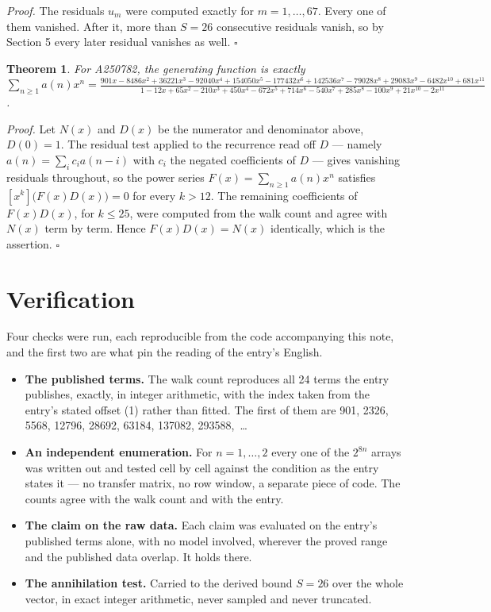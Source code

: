 \documentclass[11pt]{article}
\newtheorem{theorem}{Theorem}
\theoremstyle{definition}
\begin{document}
{\itshape Proof.} The residuals $u_m$ were computed exactly for $m = 1,\dots,67$. Every one of them vanished. After it, more than $S = 26$ consecutive residuals vanish, so by Section 5 every later residual vanishes as well. $\square$

\begin{theorem} For A250782, the generating function is exactly $\sum_{n\ge 1} a(n)x^n = \frac{901x - 8486x^{2} + 36221x^{3} - 92040x^{4} + 154050x^{5} - 177432x^{6} + 142536x^{7} - 79028x^{8} + 29083x^{9} - 6482x^{10} + 681x^{11}}{1 - 12x + 65x^{2} - 210x^{3} + 450x^{4} - 672x^{5} + 714x^{6} - 540x^{7} + 285x^{8} - 100x^{9} + 21x^{10} - 2x^{11}}$.\end{theorem}

{\itshape Proof.} Let $N(x)$ and $D(x)$ be the numerator and denominator above, $D(0)=1$. The residual test applied to the recurrence read off $D$ --- namely $a(n) = \sum_i c_i a(n-i)$ with $c_i$ the negated coefficients of $D$ --- gives vanishing residuals throughout, so the power series $F(x)=\sum_{n\ge 1}a(n)x^n$ satisfies $[x^k]\bigl(F(x)D(x)\bigr) = 0$ for every $k > 12$. The remaining coefficients of $F(x)D(x)$, for $k \le 25$, were computed from the walk count and agree with $N(x)$ term by term. Hence $F(x)D(x) = N(x)$ identically, which is the assertion. $\square$

\section{Verification}

Four checks were run, each reproducible from the code accompanying this note, and the first two are what pin the reading of the entry's English.

\begin{itemize}

\item {\bfseries The published terms.} The walk count reproduces all 24 terms the entry publishes, exactly, in integer arithmetic, with the index taken from the entry's stated offset (1) rather than fitted. The first of them are 901, 2326, 5568, 12796, 28692, 63184, 137082, 293588,~\dots

\item {\bfseries An independent enumeration.} For $n = 1,\dots,2$ every one of the $2^{8n}$ arrays was written out and tested cell by cell against the condition as the entry states it --- no transfer matrix, no row window, a separate piece of code. The counts agree with the walk count and with the entry.

\item {\bfseries The claim on the raw data.} Each claim was evaluated on the entry's published terms alone, with no model involved, wherever the proved range and the published data overlap. It holds there.

\item {\bfseries The annihilation test.} Carried to the derived bound $S = 26$ over the whole vector, in exact integer arithmetic, never sampled and never truncated.

\end{itemize}
\end{document}
